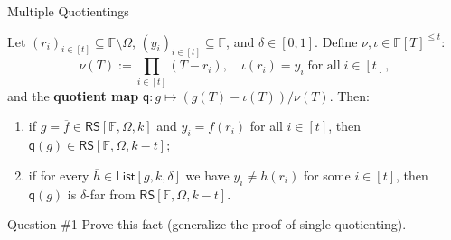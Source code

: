 \documentclass{zkdl-presentation-template}
\begin{document}
    \begin{frame}{Multiple Quotientings}
        \begin{proposition}
            Let $(r_i)_{i \in [t]} \subseteq \mathbb{F} \setminus \Omega$, $(y_i)_{i \in [t]} \subseteq \mathbb{F}$, and $\delta \in [0,1]$. Define $\nu,\iota \in \mathbb{F}[T]^{\leq t}$:
            \begin{equation*}
                \nu(T) := \prod_{i \in [t]} (T-r_i), \quad \iota(r_i) = y_i \; \text{for all} \; i \in [t],
            \end{equation*}
            and the \textbf{quotient map} $\mathsf{q}: g \mapsto (g(T)-\iota(T))/\nu(T)$. Then:
            \begin{enumerate}
                \item if $g = \overline{f} \in \mathsf{RS}[\mathbb{F}, \Omega, k]$ and $y_i=f(r_i)$ for all $i \in [t]$, then $\mathsf{q}(g) \in \mathsf{RS}[\mathbb{F},\Omega,k-t]$;
                \item if for every $\overline{h} \in \mathsf{List}[g,k,\delta]$ we have $y_i \neq h(r_i)$ for some $i \in [t]$, then $\mathsf{q}(g)$ is $\delta$-far from $\mathsf{RS}[\mathbb{F},\Omega,k-t]$.
            \end{enumerate}
        \end{proposition}
        \pause

        \begin{questionblock}{Question \#1}
            Prove this fact (generalize the proof of single quotienting).
        \end{questionblock}
    \end{frame}
\end{document}
